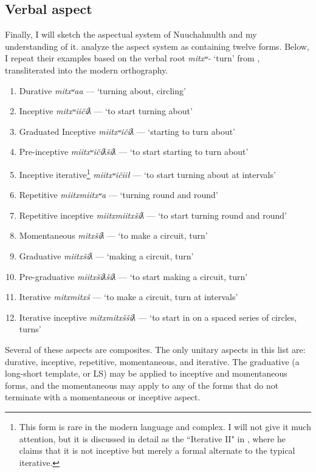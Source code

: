 \subsection{Verbal aspect} \label{ch:clause:aspect}

Finally, I will sketch the aspectual system of Nuuchahnulth and my understanding of it. \citet[p.~240--241]{sapir1939} analyze the aspect system as containing twelve forms. Below, I repeat their examples based on the verbal root \textit{mitxʷ-} `turn' from \citeauthor{sapir1939},  transliterated into the modern orthography.

\begin{enumerate}[noitemsep]
\item Durative \textit{mitxʷaa} --- `turning about, circling'
\item Inceptive \textit{mitxʷiičiƛ} --- `to start turning about'
\item Graduated Inceptive \textit{miitxʷičiƛ} --- `starting to turn about'
\item Pre-inceptive \textit{miitxʷičiƛšiƛ} --- `to start starting to turn about'
\item Inceptive iterative\footnote{This form is rare in the modern language and complex. I will not give it much attention, but it is discussed in detail as the ``Iterative II" in \citet[p.~242--244]{davidson2002}, where he claims that it is not inceptive but merely a formal alternate to the typical iterative.} \textit{miitxʷičiił} --- `to start turning about at intervals'
\item Repetitive \textit{miitxmiitxʷa} --- `turning round and round'
\item Repetitive inceptive \textit{miitxmiitxšiƛ} --- `to start turning round and round'
\item Momentaneous \textit{mitxšiƛ} --- `to make a circuit, turn'
\item Graduative \textit{miitxšiƛ} --- `making a circuit, turn'
\item Pre-graduative \textit{miitxšiƛšiƛ} --- `to start making a circuit, turn'
\item Iterative \textit{mitxmitxš} --- `to make a circuit, turn at intervals'
\item Iterative inceptive \textit{mitxmitxššiƛ} --- `to start in on a spaced series of circles, turns'
\end{enumerate}

Several of these aspects are composites. The only unitary aspects in this list are: durative, inceptive, repetitive, momentaneous, and iterative. The graduative (a long-short template, or LS) may be applied to inceptive and momentaneous forms, and the momentaneous may apply to any of the forms that do not terminate with a momentaneous or inceptive aspect.

